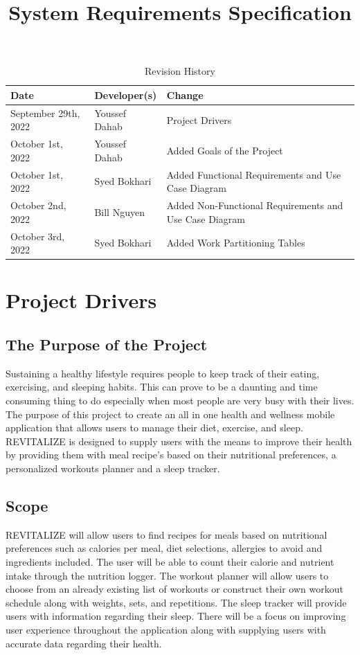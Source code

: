 \documentclass[12pt,letterpaper]{article}
\title{System Requirements Specification\\\progname}
\author{\authname}
\date{}
\begin{document}
\maketitle

\begin{table}[hp]
	\caption{Revision History} \label{TblRevisionHistory}
	\begin{tabularx}{\textwidth}{llX}
		\toprule
		\textbf{Date} & \textbf{Developer(s)} & \textbf{Change}\\
		\midrule
		September 29th, 2022 & Youssef Dahab & Project Drivers \\
		October 1st, 2022 & Youssef Dahab & Added Goals of the Project \\
		October 1st, 2022 & Syed Bokhari & Added Functional Requirements and Use Case Diagram \\
		October 2nd, 2022 & Bill Nguyen & Added Non-Functional Requirements and Use Case Diagram \\
		October 3rd, 2022 & Syed Bokhari & Added Work Partitioning Tables \\
		\bottomrule
	\end{tabularx}
\end{table}

\newpage
\tableofcontents
\newpage

\section{Project Drivers}

\subsection{The Purpose of the Project}
Sustaining a healthy lifestyle requires people to keep track of their eating, exercising, and sleeping habits. This can prove to be a daunting and time consuming thing to do especially when most people are very busy with their lives. The purpose of this project to create an all in one health and wellness mobile application that allows users to manage their diet, exercise, and sleep. REVITALIZE is designed to supply users with the means to improve their health by providing them with meal recipe's based on their nutritional preferences, a personalized workouts planner and a sleep tracker. 

\subsection{Scope}
REVITALIZE will allow users to find recipes for meals based on nutritional preferences such as calories per meal, diet selections, allergies to avoid and ingredients included. The user will be able to count their calorie and nutrient intake through the nutrition logger. The workout planner will allow users to choose from an already existing list of workouts or construct their own workout schedule along with weights, sets, and repetitions. The sleep tracker will provide users with information regarding their sleep. There will be a focus on improving user experience throughout the application along with supplying users with accurate data regarding their health.
\end{document}
